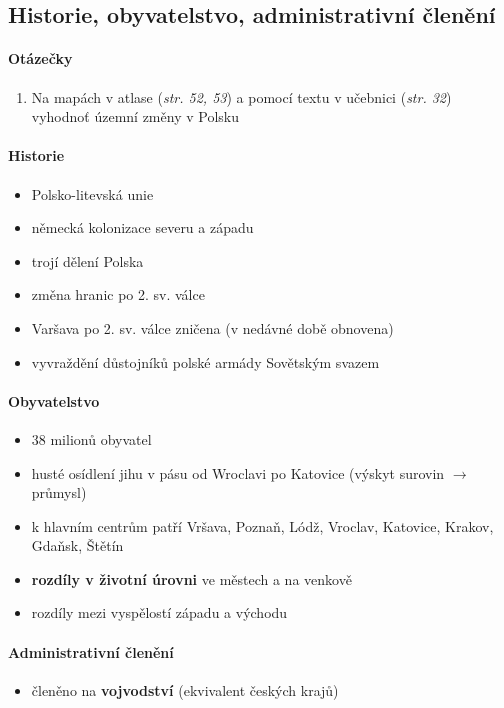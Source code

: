 \subsection{Historie, obyvatelstvo, administrativní členění}
\paragraph{Otázečky}
\begin{enumerate}
\item Na mapách v atlase (\textit{str. 52, 53}) a pomocí textu v učebnici (\textit{str. 32}) vyhodnoť územní změny v Polsku
\end{enumerate}

\paragraph{Historie}
\begin{itemize}
\item Polsko-litevská unie
\item německá kolonizace severu a západu
\item trojí dělení Polska
\item změna hranic po 2. sv. válce
\item Varšava po 2. sv. válce zničena (v nedávné době obnovena)
\item vyvraždění důstojníků polské armády Sovětským svazem
\end{itemize}

\paragraph{Obyvatelstvo}
\begin{itemize}
\item 38 milionů obyvatel
\item husté osídlení jihu v pásu od Wroclavi po Katovice (výskyt surovin $\rightarrow$ průmysl)
\item k hlavním centrům patří Vršava, Poznaň, Lódž, Vroclav, Katovice, Krakov, Gdaňsk, Štětín
\item \textbf{rozdíly v životní úrovni} ve městech a na venkově
\item rozdíly mezi vyspělostí západu a východu
\end{itemize}

\paragraph{Administrativní členění}
\begin{itemize}
\item členěno na \textbf{vojvodství} (ekvivalent českých krajů)
\end{itemize}

